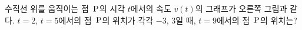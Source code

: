 \noindent\begin{minipage}[t]{0.58\linewidth}\vspace{0pt}\raggedright 수직선 위를 움직이는 점~$\mathrm{P}$의 시각 $t$에서의 속도 $v(t)$의 그래프가 오른쪽 그림과 같다. $t=2$, $t=5$에서의 점~$\mathrm{P}$의 위치가 각각 $-3$, $3$일 때, $t=9$에서의 점~$\mathrm{P}$의 위치는?\end{minipage}\hfill\begin{minipage}[t]{0.4\linewidth}\vspace{0pt}\centering \resizebox{\ifdim\width>\linewidth\linewidth\else\width\fi}{!}{}\end{minipage}\par
{}
